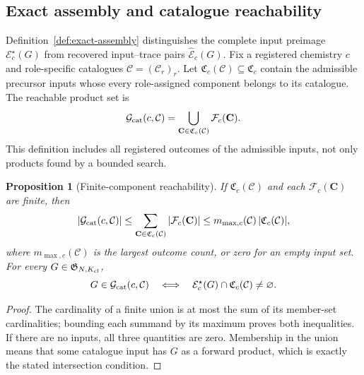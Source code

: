 \documentclass{article}
\newtheorem{proposition}[theorem]{Proposition}
\theoremstyle{definition}
\begin{document}
\subsection{Exact assembly and catalogue reachability}
\label{app:catalogue-reachability}

Definition~\ref{def:exact-assembly} distinguishes the complete input preimage
$\mathcal E_c^\star(G)$ from recovered input--trace pairs $\widehat{\mathcal E}_c(G)$.
Fix a registered chemistry $c$ and role-specific catalogues $\mathcal C=(\mathcal C_r)_r$. Let
$\mathfrak C_c(\mathcal C)\subseteq\mathfrak C_c$ contain the admissible precursor inputs whose
every role-assigned component belongs to its catalogue. The reachable product set is
\begin{equation}
 \mathcal G_{\rm cat}(c,\mathcal C)
 =\bigcup_{\mathbf C\in\mathfrak C_c(\mathcal C)}\mathcal F_c(\mathbf C).
 \label{eq:catalogue-reachable}
\end{equation}
This definition includes all registered outcomes of the admissible inputs, not only products found
by a bounded search.

\begin{proposition}[Finite-component reachability]
\label{prop:catalogue-bound}
If $\mathfrak C_c(\mathcal C)$ and each $\mathcal F_c(\mathbf C)$ are finite, then
\begin{equation}
 |\mathcal G_{\rm cat}(c,\mathcal C)|
 \leq\sum_{\mathbf C\in\mathfrak C_c(\mathcal C)}|\mathcal F_c(\mathbf C)|
 \leq m_{\max,c}(\mathcal C)\,|\mathfrak C_c(\mathcal C)|,
\end{equation}
where $m_{\max,c}(\mathcal C)$ is the largest outcome count, or zero for an empty input set.
For every $G\in\mathfrak G_{N,K_{\rm cl}}$,
\begin{equation}
 G\in\mathcal G_{\rm cat}(c,\mathcal C)
 \quad\Longleftrightarrow\quad
 \mathcal E_c^\star(G)\cap\mathfrak C_c(\mathcal C)\neq\varnothing.
\end{equation}
\end{proposition}
\begin{proof}
The cardinality of a finite union is at most the sum of its member-set cardinalities; bounding each
summand by its maximum proves both inequalities. If there are no inputs, all three quantities are
zero. Membership in the union means that some catalogue input has $G$ as a forward product, which
is exactly the stated intersection condition.
\end{proof}
\end{document}
